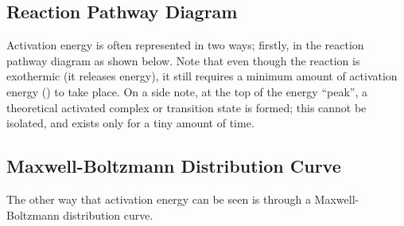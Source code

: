 		\pagebreak
		\subsection{Reaction Pathway Diagram}

			Activation energy is often represented in two ways; firstly, in the reaction pathway diagram as shown below. Note that even though
			the reaction is exothermic (it releases energy), it still requires a minimum amount of activation energy (\ea) to take place. On a side
			note, at the top of the energy ``peak'', a theoretical activated complex or transition state is formed; this cannot be isolated, and
			exists only for a tiny amount of time.





		\subsection{Maxwell-Boltzmann Distribution Curve}

			The other way that activation energy can be seen is through a Maxwell-Boltzmann distribution curve.

